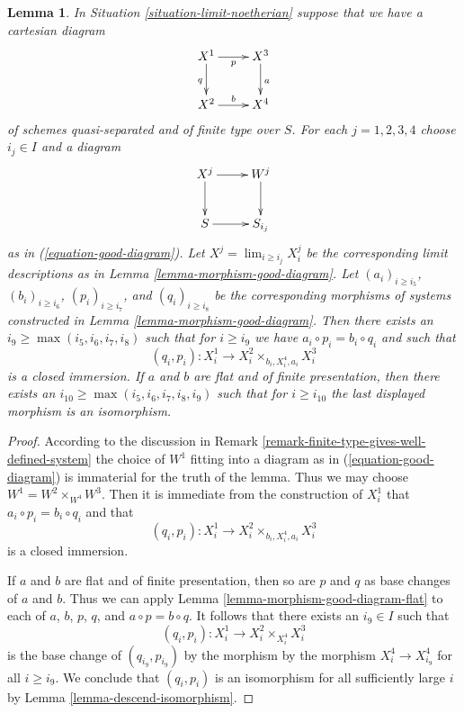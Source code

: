 \documentclass[10pt,a4paper]{amsart}
\theoremstyle{plain}
\newtheorem{lemma}[subsection]{Lemma}
\theoremstyle{definition}
\theoremstyle{remark}
\numberwithin{equation}{subsection}
\def\lim{\mathop{\mathrm{lim}}\nolimits}
\begin{document}
\begin{lemma}
\label{lemma-good-diagram-fibre-product}
In Situation \ref{situation-limit-noetherian} suppose that we have a
cartesian diagram
$$
\xymatrix{
X^1 \ar[r]_p \ar[d]_q & X^3 \ar[d]^a \\
X^2 \ar[r]^b & X^4
}
$$
of schemes quasi-separated and of finite type over $S$.
For each $j = 1, 2, 3, 4$ choose $i_j \in I$ and a diagram
$$
\xymatrix{
X^j \ar[r] \ar[d] & W^j \ar[d] \\
S \ar[r] & S_{i_j}
}
$$
as in (\ref{equation-good-diagram}). Let
$X^j = \lim_{i \geq i_j} X^j_i$ be the corresponding limit descriptions
as in Lemma \ref{lemma-morphism-good-diagram}.
Let $(a_i)_{i \geq i_5}$, $(b_i)_{i \geq i_6}$, $(p_i)_{i \geq i_7}$, and
$(q_i)_{i \geq i_8}$ be the corresponding morphisms of systems constructed
in Lemma \ref{lemma-morphism-good-diagram}. Then there exists an
$i_9 \geq \max(i_5, i_6, i_7, i_8)$ such that for $i \geq i_9$ we have
$a_i \circ p_i = b_i \circ q_i$ and such that
$$
(q_i, p_i) : X^1_i \longrightarrow X^2_i \times_{b_i, X^4_i, a_i} X^3_i
$$
is a closed immersion.
If $a$ and $b$ are flat and of finite presentation, then there exists an
$i_{10} \geq \max(i_5, i_6, i_7, i_8, i_9)$ such that for $i \geq i_{10}$
the last displayed morphism is an isomorphism.
\end{lemma}

\begin{proof}
According to the discussion in
Remark \ref{remark-finite-type-gives-well-defined-system}
the choice of $W^1$ fitting into a diagram as in
(\ref{equation-good-diagram}) is immaterial for the truth of
the lemma. Thus we may choose $W^1 = W^2 \times_{W^4} W^3$.
Then it is immediate from the construction of $X^1_i$ that 
$a_i \circ p_i = b_i \circ q_i$ and that
$$
(q_i, p_i) : X^1_i \longrightarrow X^2_i \times_{b_i, X^4_i, a_i} X^3_i
$$
is a closed immersion.

\medskip\noindent
If $a$ and $b$ are flat and of finite presentation, then so are
$p$ and $q$ as base changes of $a$ and $b$. Thus we can apply
Lemma \ref{lemma-morphism-good-diagram-flat}
to each of $a$, $b$, $p$, $q$, and $a \circ p = b \circ q$.
It follows that there exists an $i_9 \in I$ such that
$$
(q_i, p_i) : X^1_i \to X^2_i \times_{X^4_i} X^3_i
$$
is the base change of $(q_{i_9}, p_{i_9})$ by the morphism
by the morphism $X^4_i \to X^4_{i_9}$ for all $i \geq i_9$.
We conclude that $(q_i, p_i)$ is an isomorphism for all sufficiently
large $i$ by Lemma \ref{lemma-descend-isomorphism}.
\end{proof}
\end{document}
